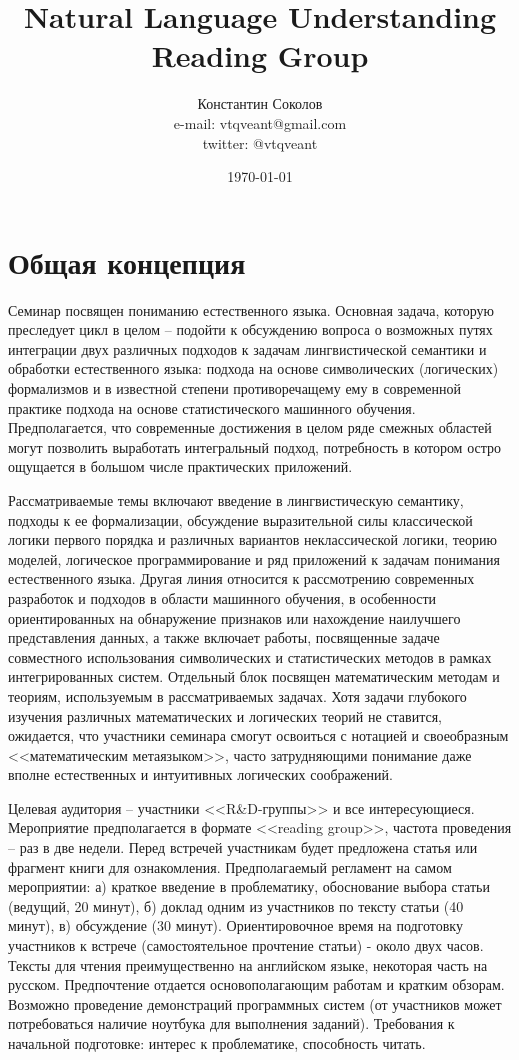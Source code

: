\documentclass[a4paper,12pt]{article}
\title{Natural Language Understanding\\ Reading Group}
\author{
        Константин Соколов\\
        e-mail: vtqveant@gmail.com\\
        twitter: @vtqveant
}
\date{\today}
\begin{document}
\maketitle

\section{Общая концепция}

Семинар посвящен пониманию естественного языка. Основная задача, которую преследует цикл в целом -- подойти к обсуждению вопроса о возможных путях интеграции двух различных подходов к задачам лингвистической семантики и обработки естественного языка: подхода на основе символических (логических) формализмов и в известной степени противоречащему ему в современной практике подхода на основе статистического машинного обучения. Предполагается, что современные достижения в целом ряде смежных областей могут позволить выработать интегральный подход, потребность в котором остро ощущается в большом числе практических приложений. 

Рассматриваемые темы включают введение в лингвистическую семантику, подходы к ее формализации, обсуждение выразительной силы классической логики первого порядка и различных вариантов неклассической логики, теорию моделей, логическое программирование и ряд приложений к задачам понимания естественного языка. Другая линия относится к   рассмотрению современных разработок и подходов в области машинного обучения, в особенности ориентированных на обнаружение признаков или нахождение наилучшего представления данных, а также включает работы, посвященные задаче совместного использования символических и статистических методов в рамках интегрированных систем. Отдельный блок посвящен математическим методам и теориям, используемым в рассматриваемых задачах. Хотя задачи глубокого изучения различных математических и логических теорий не ставится, ожидается, что участники семинара смогут освоиться с нотацией и своеобразным <<математическим метаязыком>>, часто затрудняющими понимание даже вполне естественных и интуитивных логических соображений.

Целевая аудитория -- участники <<R\&D-группы>> и все интересующиеся. Мероприятие предполагается в формате <<reading group>>, частота проведения -- раз в две недели. Перед встречей участникам будет предложена статья или фрагмент книги для ознакомления. Предполагаемый регламент на самом мероприятии: а) краткое введение в проблематику, обоснование выбора статьи (ведущий, 20 минут), б) доклад одним из участников по тексту статьи (40 минут), в) обсуждение (30 минут). Ориентировочное время на подготовку участников к встрече (самостоятельное прочтение статьи) - около двух часов. Тексты для чтения преимущественно на английском языке, некоторая часть на русском. Предпочтение отдается основополагающим работам и кратким обзорам. Возможно проведение демонстраций программных систем (от участников может потребоваться наличие ноутбука для выполнения заданий). Требования к начальной подготовке: интерес к проблематике, способность читать.
\end{document}
